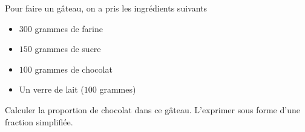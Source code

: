 
\begin{exercice}\label{exosmath-0893}

Pour faire un gâteau, on a pris les ingrédients suivants
\begin{itemize}
    \item 
 $300$ grammes de farine
 \item
 $150$ grammes de sucre
 \item
 $100$ grammes de chocolat
 \item
 Un verre de lait ($100$ grammes)
\end{itemize}
Calculer la proportion de chocolat dans ce gâteau. L'exprimer sous forme d'une fraction simplifiée.

\end{exercice}
